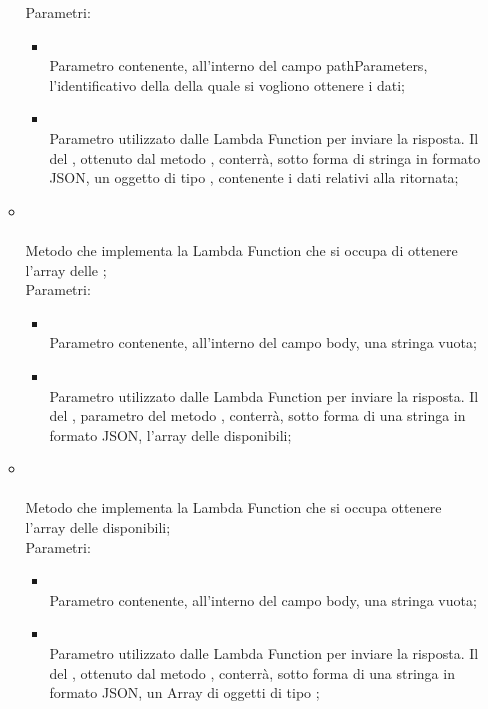 \begin{itemize}
\begin{itemize}
		Parametri:
		\begin{itemize}
			\item {} \\
			Parametro contenente, all'interno del campo pathParameters, l'identificativo della  della quale si vogliono ottenere i dati;
			\item {} \\
			Parametro utilizzato dalle Lambda Function per inviare la risposta. Il  del , ottenuto dal metodo , conterrà, sotto forma di stringa in formato JSON, un oggetto di tipo , contenente i dati relativi alla  ritornata;
		\end{itemize}
		\item[]  \\\\		Metodo che implementa la Lambda Function che si occupa di ottenere l'array delle ;\\
		Parametri:
		\begin{itemize}
			\item {} \\
			Parametro contenente, all'interno del campo body, una stringa vuota;
			\item {} \\
			Parametro utilizzato dalle Lambda Function per inviare la risposta. Il  del , parametro del metodo , conterrà, sotto forma di una stringa in formato JSON,  l'array delle  disponibili;
		\end{itemize}
		\item[]  \\\\		Metodo che implementa la Lambda Function che si occupa ottenere l'array delle  disponibili;\\
		Parametri:
		\begin{itemize}
			\item {} \\
			Parametro contenente, all'interno del campo body, una stringa vuota;
			\item {} \\
			Parametro utilizzato dalle Lambda Function per inviare la risposta. Il  del , ottenuto dal metodo , conterrà, sotto forma di una stringa in formato JSON,  un Array di oggetti di tipo ;

\end{itemize}
\end{itemize}
\end{itemize}
